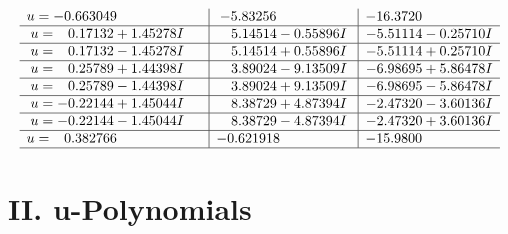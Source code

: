 \documentclass[1p]{elsarticle_modified}
\theoremstyle{definition}
\begin{document}
$$\begin{array}{c|c|c}
\begin{aligned}
u &= -0.663049\phantom{ +0.000000I}\end{aligned}
 & -5.83256\phantom{ +0.000000I} & -16.3720\phantom{ +0.000000I} \\ \hline\begin{aligned}
u &= \phantom{-}0.17132 + 1.45278 I\end{aligned}
 & \phantom{-}5.14514 - 0.55896 I & -5.51114 - 0.25710 I \\ \hline\begin{aligned}
u &= \phantom{-}0.17132 - 1.45278 I\end{aligned}
 & \phantom{-}5.14514 + 0.55896 I & -5.51114 + 0.25710 I \\ \hline\begin{aligned}
u &= \phantom{-}0.25789 + 1.44398 I\end{aligned}
 & \phantom{-}3.89024 - 9.13509 I & -6.98695 + 5.86478 I \\ \hline\begin{aligned}
u &= \phantom{-}0.25789 - 1.44398 I\end{aligned}
 & \phantom{-}3.89024 + 9.13509 I & -6.98695 - 5.86478 I \\ \hline\begin{aligned}
u &= -0.22144 + 1.45044 I\end{aligned}
 & \phantom{-}8.38729 + 4.87394 I & -2.47320 - 3.60136 I \\ \hline\begin{aligned}
u &= -0.22144 - 1.45044 I\end{aligned}
 & \phantom{-}8.38729 - 4.87394 I & -2.47320 + 3.60136 I \\ \hline\begin{aligned}
u &= \phantom{-}0.382766\phantom{ +0.000000I}\end{aligned}
 & -0.621918\phantom{ +0.000000I} & -15.9800\phantom{ +0.000000I}\\
 \hline 
 \end{array}$$\newpage
\newpage\renewcommand{\arraystretch}{1}
\centering \section*{ II. u-Polynomials}
\end{document}
